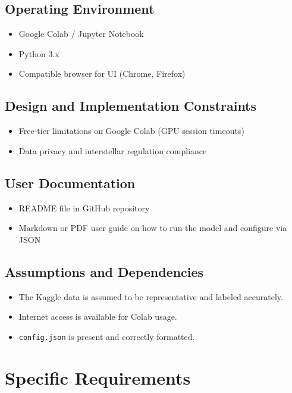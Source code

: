 \documentclass[15pt]{article}
\begin{document}
\subsection{Operating Environment}
\begin{itemize}
  \item Google Colab / Jupyter Notebook
  \item Python 3.x
  \item Compatible browser for UI (Chrome, Firefox)
\end{itemize}

\subsection{Design and Implementation Constraints}
\begin{itemize}
  \item Free-tier limitations on Google Colab (GPU session timeouts)
  \item Data privacy and interstellar regulation compliance
\end{itemize}

\subsection{User Documentation}
\begin{itemize}
  \item README file in GitHub repository
  \item Markdown or PDF user guide on how to run the model and configure via JSON
\end{itemize}

\subsection{Assumptions and Dependencies}
\begin{itemize}
  \item The Kaggle data is assumed to be representative and labeled accurately.
  \item Internet access is available for Colab usage.
  \item \texttt{config.json} is present and correctly formatted.
\end{itemize}

\section{Specific Requirements}
\end{document}
